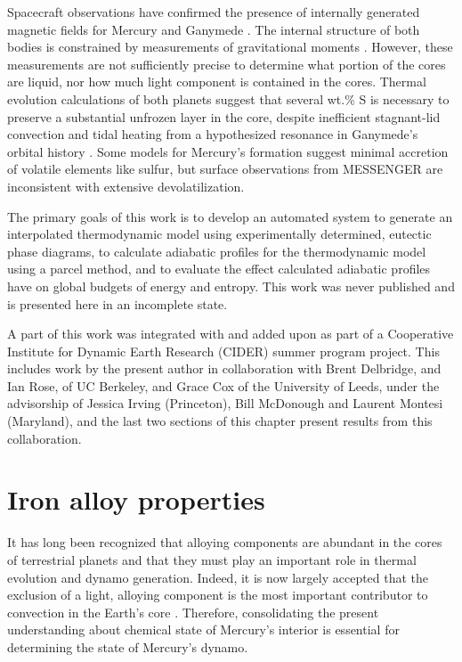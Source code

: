 Spacecraft observations have confirmed the presence of internally generated
magnetic fields for Mercury \citep{Anderson2011} and Ganymede \cite{Kivelson1996}.
The internal structure of both bodies is constrained by measurements of
gravitational moments \citep{Smith2012,Hauck2006}. However, these measurements are
not sufficiently precise to determine what portion of the cores are liquid, nor
how much light component is contained in the cores. Thermal evolution
calculations of both planets \citep{Hauck2004,Hauck2006,Breuer2007,Bland2008} suggest
that several wt.\% S is necessary to preserve a substantial unfrozen layer in
the core, despite inefficient stagnant-lid convection
\citep{Solomatov2000,Hauck2004,Breuer2007} and tidal heating from a hypothesized
resonance in Ganymede's orbital history \citep{Showman1997,Bland2008}. Some models
for Mercury's formation suggest minimal accretion of volatile elements like
sulfur, but surface observations from MESSENGER \citep{Nittler2011,Mccubbin2012} are
inconsistent with extensive devolatilization.

The primary goals of this work is to develop an automated system to generate an
interpolated thermodynamic model using experimentally determined, eutectic
phase diagrams, to calculate adiabatic profiles for the thermodynamic model
using a parcel method, and to evaluate the effect calculated adiabatic profiles
have on global budgets of energy and entropy. This work was never published and
is presented here in an incomplete state.

A part of this work was integrated with and added upon as part of a Cooperative
Institute for Dynamic Earth Research (CIDER) summer program project. This includes
work by the present author in collaboration with Brent Delbridge, and Ian Rose, of UC
Berkeley, and Grace Cox of the University of Leeds, under the advisorship of Jessica
Irving (Princeton), Bill McDonough and Laurent Montesi (Maryland), and  the last two
sections of this chapter present results from this collaboration.

\section{Iron alloy properties}

It has long been recognized that alloying components are abundant in the cores
of terrestrial planets and that they must play an important role in thermal
evolution and dynamo generation. Indeed, it is now largely accepted that the
exclusion of a light, alloying component is the most important contributor to
convection in the Earth's core \citep{Lister1995}. Therefore,
consolidating the present understanding about chemical state of Mercury's
interior is essential for determining the state of
Mercury's dynamo.

